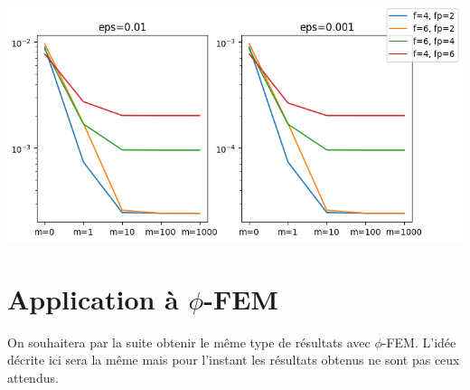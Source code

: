 \documentclass[french]{article}
\begin{document}
	\begin{minipage}{\linewidth}
		\centering
		\includegraphics[width=0.6\linewidth]{courbes.png}
	\end{minipage}

	\section*{Application à $\phi$-FEM}
	
	On souhaitera par la suite obtenir le même type de résultats avec $\phi$-FEM. L'idée décrite ici sera la même mais pour l'instant les résultats obtenus ne sont pas ceux attendus.
	
\end{document}
